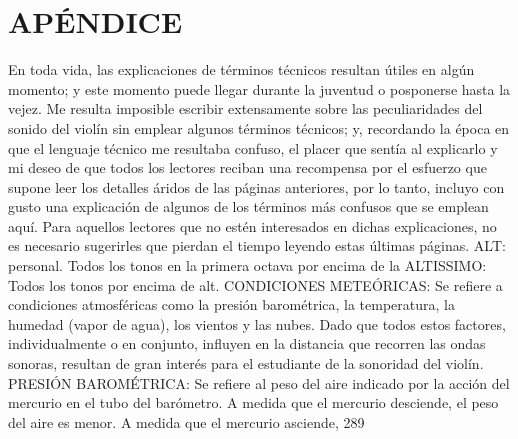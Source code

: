 \chapter*{APÉNDICE}
En toda vida, las explicaciones de términos técnicos resultan útiles en algún momento; y este momento puede llegar durante la juventud o posponerse hasta la vejez. Me resulta imposible escribir extensamente sobre las peculiaridades del sonido del violín sin emplear algunos términos técnicos; y, recordando la época en que el lenguaje técnico me resultaba confuso, el placer que sentía al explicarlo y mi deseo de que todos los lectores reciban una recompensa por el esfuerzo que supone leer los detalles áridos de las páginas anteriores, por lo tanto, incluyo con gusto una explicación de algunos de los términos más confusos que se emplean aquí. Para aquellos lectores que no estén interesados en dichas explicaciones, no es necesario sugerirles que pierdan el tiempo leyendo estas últimas páginas.
ALT: personal.	Todos los tonos en la primera octava por encima de la
ALTISSIMO: Todos los tonos por encima de alt.
CONDICIONES METEÓRICAS: Se refiere a condiciones atmosféricas como la presión barométrica, la temperatura, la humedad (vapor de agua), los vientos y las nubes. Dado que todos estos factores, individualmente o en conjunto, influyen en la distancia que recorren las ondas sonoras, resultan de gran interés para el estudiante de la sonoridad del violín.
PRESIÓN BAROMÉTRICA: Se refiere al peso del aire indicado por la acción del mercurio en el tubo del barómetro. A medida que el mercurio desciende, el peso del aire es menor. A medida que el mercurio asciende,
289

